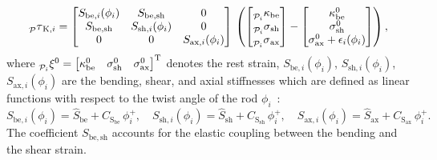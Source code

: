 \begin{equation}
    \prescript{}{\mathcal{P}}{\tau}_{\mathrm{K},i} = 
    \begin{bmatrix}
        S_{\mathrm{be},i}(\phi_i) & S_{\mathrm{be},\mathrm{sh}} & 0\\
        S_{\mathrm{be},\mathrm{sh}} & S_{\mathrm{sh},i}(\phi_i) & 0\\
        0 & 0 & S_{\mathrm{ax},i}(\phi_i)
    \end{bmatrix} 
    \, \left ( \begin{bmatrix}
        \prescript{}{\mathcal{P}_i}{\kappa}_\mathrm{be}\\ \prescript{}{\mathcal{P}_i}{\sigma}_\mathrm{sh}\\ \prescript{}{\mathcal{P}_i}{\sigma}_\mathrm{ax}
    \end{bmatrix} - \begin{bmatrix}
        \kappa_\mathrm{be}^0\\ \sigma_\mathrm{sh}^0\\ \sigma_\mathrm{ax}^0 + \epsilon_i (\phi_i)
    \end{bmatrix} \right ),
\end{equation}
where $\prescript{}{\mathcal{P}_i}{\xi}^0 = \begin{bmatrix}\kappa_\mathrm{be}^0 & \sigma_\mathrm{sh}^0 & \sigma_\mathrm{ax}^0\end{bmatrix}^\mathrm{T}$ denotes the rest strain,
$S_{\mathrm{be},i}(\phi_i)$, $S_{\mathrm{sh},i}(\phi_i)$, $S_{\mathrm{ax},i}(\phi_i)$ are the bending, shear, and axial stiffnesses which are defined as linear functions with respect to the twist angle of the rod $\phi_i$~\cite{good2022expanding, stolzle2023modelling}:
\begin{equation}
    S_{\mathrm{be},i}(\phi_i) = \hat{S}_{\mathrm{be}} + C_{\mathrm{S}_\mathrm{be}} \, \phi_{i}^+,
    \quad
    S_{\mathrm{sh},i}(\phi_i) = \hat{S}_{\mathrm{sh}} + C_{\mathrm{S}_\mathrm{sh}} \, \phi_{i}^+,
    \quad 
    S_{\mathrm{ax},i}(\phi_i) = \hat{S}_{\mathrm{ax}} + C_{\mathrm{S}_\mathrm{ax}} \, \phi_{i}^+.
\end{equation}
The coefficient $S_{\mathrm{be},\mathrm{sh}}$ accounts for the elastic coupling between the bending and the shear strain. 
